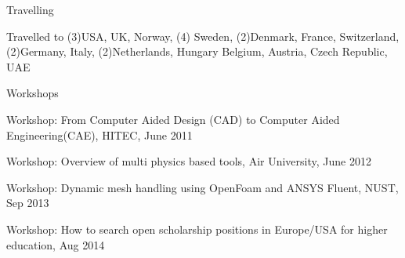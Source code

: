 

\begin{cventries}

  \cventry
    {} %
    {Travelling} %
    {} %
    {} %
    {
      \begin{cvitems} %
        \item {Travelled to  (3\times)USA, UK, Norway,  (4\times) Sweden,  (2\times)Denmark, France, Switzerland,  (2\times)Germany, Italy,  (2\times)Netherlands, Hungary Belgium, Austria, Czech Republic, UAE}
      \end{cvitems}
    }
  \cventry
{} %
{Workshops} %
{} %
{} %
{
	\begin{cvitems} %
		\item{Workshop: From Computer Aided Design (CAD) to Computer Aided Engineering(CAE), HITEC, June 2011}
		\item{Workshop: Overview of multi physics based tools, Air University, June 2012}
		\item {Workshop: Dynamic mesh handling using OpenFoam and ANSYS Fluent, NUST, Sep 2013}
		\item {Workshop: How to search open scholarship positions in Europe/USA for higher education, Aug 2014}
	\end{cvitems}
}

\end{cventries}
